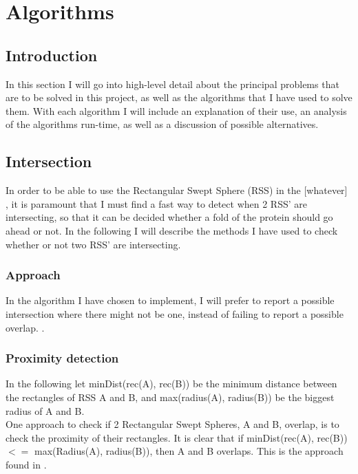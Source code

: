 
\section{Algorithms}
\label{algorithms}

\subsection{Introduction}
In this section I will go into high-level detail about the principal problems that are to be solved in this project, as well as the algorithms that I have used to solve them. With each algorithm I will include an explanation of their use, an analysis of the algorithms run-time, as well as a discussion of possible alternatives. 

\subsection{Intersection}
In order to be able to use the Rectangular Swept Sphere (RSS) in the [whatever] , it is paramount that I must find a fast way to detect when 2 RSS' are intersecting, so that it can be decided whether a fold of the protein should go ahead or not. In the following I will describe the methods I have used to check whether or not two RSS' are intersecting.

\subsubsection{Approach}
In the algorithm I have chosen to implement, I will prefer to report a possible intersection where there might not be one, instead of failing to report a possible overlap. .

\subsubsection{Proximity detection}
In the following let minDist(rec(A), rec(B)) be the minimum distance between the rectangles of RSS A and B, and max(radius(A), radius(B)) be the biggest radius of A and B.\\

One approach to check if 2 Rectangular Swept Spheres, A and B, overlap, is to check the proximity of their rectangles. It is clear that if minDist(rec(A), rec(B)) $<=$ max(Radius(A), radius(B)), then A and B overlaps. This is the approach found in \cite{Larsen99fastproximity}.

